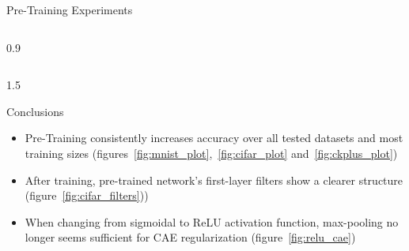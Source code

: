 \documentclass[final]{beamer}
\newlength{\onecolwid}
\newlength{\threecolwid}
\begin{document}
\begin{frame}[t]
\begin{columns}[t]
\begin{column}{\threecolwid}
\begin{alertblock}{Pre-Training Experiments}
\begin{columns}[t, totalwidth=0.9\threecolwid]
\begin{column}{0.9\onecolwid}
\begin{block}{}
	\end{block}



	\end{column}
\end{columns}


\end{alertblock}

\begin{alertblock} %

\begin{columns}[t]

	\begin{column}{1.5\onecolwid}

		\begin{block}{Conclusions}

			\begin{itemize}
				\item Pre-Training consistently increases accuracy over all tested datasets and most training sizes (figures~\ref{fig:mnist_plot},~\ref{fig:cifar_plot} and~\ref{fig:ckplus_plot})

				\item After training, pre-trained network's first-layer filters show a clearer structure (figure~\ref{fig:cifar_filters}))

				\item When changing from sigmoidal to ReLU activation function, max-pooling no longer seems sufficient for CAE regularization (figure~\ref{fig:relu_cae}) 

			\end{itemize}

		\end{block}


\end{column}
\end{columns}
\end{alertblock}
\end{column}
\end{columns}
\end{frame}
\end{document}
